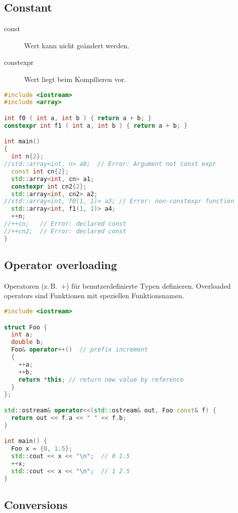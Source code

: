 \documentclass[10pt,twocolumn]{scrartcl}
\begin{document}
\subsection{Constant}

\begin{description}
  \item[const] Wert kann nicht geändert werden.
  \item[constexpr] Wert liegt beim Kompilieren vor.
\end{description}

\begin{lstlisting}[language=C++]
#include <iostream>
#include <array>

int f0 ( int a, int b ) { return a + b; }
constexpr int f1 ( int a, int b ) { return a + b; }

int main()
{
  int n{2};
//std::array<int, n> a0;  // Error: Argument not const expr
  const int cn{2};
  std::array<int, cn> a1;
  constexpr int cn2{2};
  std::array<int, cn2> a2;
//std::array<int, f0(1, 1)> a3; // Error: non-constexpr function
  std::array<int, f1(1, 1)> a4;
  ++n;
//++cn;   // Error: declared const
//++cn2;  // Error: declared const
}
\end{lstlisting}

\subsection{Operator overloading}

Operatoren (z.\,B.\ +) für benutzerdefinierte Typen definieren. Overloaded operators sind Funktionen mit speziellen Funktionsnamen.

\begin{lstlisting}[language=C++]
#include <iostream>

struct Foo {
  int a;
  double b;
  Foo& operator++()  // prefix increment
  {
    ++a;
    ++b;
    return *this; // return new value by reference
  }
};

std::ostream& operator<<(std::ostream& out, Foo const& f) {
  return out << f.a << " " << f.b;
}

int main() {
  Foo x = {0, 1.5};
  std::cout << x << "\n";  // 0 1.5
  ++x;
  std::cout << x << "\n";  // 1 2.5
}
\end{lstlisting}

\subsection{Conversions}
\end{document}
